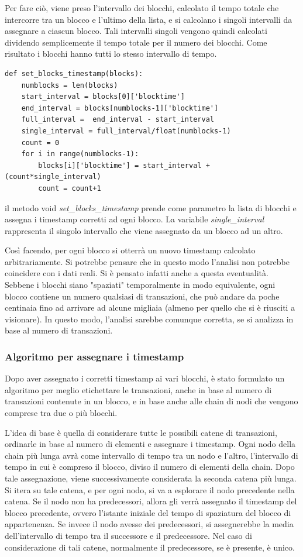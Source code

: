 Per fare ciò, viene preso l'intervallo dei blocchi, calcolato il tempo totale che intercorre tra un blocco e l'ultimo della lista, e si calcolano i singoli intervalli da assegnare a ciascun blocco. Tali intervalli singoli vengono quindi calcolati dividendo semplicemente il tempo totale per il numero dei blocchi. Come risultato i blocchi hanno tutti lo stesso intervallo di tempo.

\begin{lstlisting}[basicstyle=\tiny]
def set_blocks_timestamp(blocks):
	numblocks = len(blocks)
	start_interval = blocks[0]['blocktime']
	end_interval = blocks[numblocks-1]['blocktime']
	full_interval =  end_interval - start_interval 
	single_interval = full_interval/float(numblocks-1)
	count = 0
	for i in range(numblocks-1):
		blocks[i]['blocktime'] = start_interval + (count*single_interval)
		count = count+1	
\end{lstlisting}

il metodo void \textit{set_blocks_timestamp} prende come parametro la lista di blocchi e assegna i timestamp corretti ad ogni blocco. La variabile \textit{single_interval} rappresenta il singolo intervallo che viene assegnato da un blocco ad un altro.

Così facendo, per ogni blocco si otterrà un nuovo timestamp calcolato arbitrariamente. Si potrebbe pensare che in questo modo l'analisi non potrebbe coincidere con i dati reali. Si è pensato infatti anche a questa eventualità. Sebbene i blocchi siano "spaziati" temporalmente in modo equivalente, ogni blocco contiene un numero qualsiasi di transazioni, che può andare da poche centinaia fino ad arrivare ad alcune migliaia (almeno per quello che si è riusciti a visionare). In questo modo, l'analisi sarebbe comunque corretta, se si analizza in base al numero di transazioni.

\subsubsection{Algoritmo per assegnare i timestamp}
Dopo aver assegnato i corretti timestamp ai vari blocchi, è stato formulato un algoritmo per meglio etichettare le transazioni, anche in base al numero di transazioni contenute in un blocco, e in base anche alle chain di nodi che vengono comprese tra due o più blocchi. 

L'idea di base è quella di considerare tutte le possibili catene di transazioni, ordinarle in base al numero di elementi e assegnare i timestamp. Ogni nodo della chain più lunga avrà come intervallo di tempo tra un nodo e l'altro, l'intervallo di tempo in cui è compreso il blocco, diviso il numero di elementi della chain. Dopo tale assegnazione, viene successivamente considerata la seconda catena più lunga. Si itera su tale catena, e per ogni nodo, si va a esplorare il nodo precedente nella catena. Se il nodo non ha predecessori, allora gli verrà assegnato il timestamp del blocco precedente, ovvero l'istante iniziale del tempo di spaziatura del blocco di appartenenza. Se invece il nodo avesse dei predecessori, si assegnerebbe la media dell'intervallo di tempo tra il successore e il predecessore. Nel caso di considerazione di tali catene, normalmente il predecessore, se è presente, è unico.

